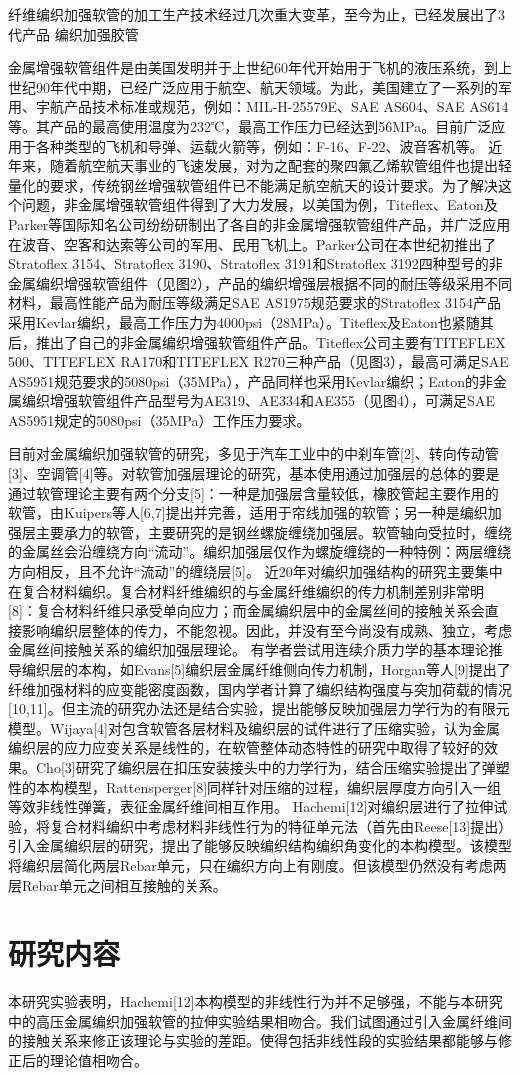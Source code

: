 纤维编织加强软管的加工生产技术经过几次重大变革，至今为止，已经发展出了3代产品
编织加强胶管

金属增强软管组件是由美国发明并于上世纪60年代开始用于飞机的液压系统，到上世纪90年代中期，已经广泛应用于航空、航天领域。为此，美国建立了一系列的军用、宇航产品技术标准或规范，例如：MIL-H-25579E、SAE AS604、SAE AS614等。其产品的最高使用温度为232℃，最高工作压力已经达到56MPa。目前广泛应用于各种类型的飞机和导弹、运载火箭等，例如：F-16、F-22、波音客机等。
近年来，随着航空航天事业的飞速发展，对为之配套的聚四氟乙烯软管组件也提出轻量化的要求，传统钢丝增强软管组件已不能满足航空航天的设计要求。为了解决这个问题，非金属增强软管组件得到了大力发展，以美国为例，Titeflex、Eaton及Parker等国际知名公司纷纷研制出了各自的非金属增强软管组件产品，并广泛应用在波音、空客和达索等公司的军用、民用飞机上。Parker公司在本世纪初推出了Stratoflex 3154、Stratoflex 3190、Stratoflex 3191和Stratoflex 3192四种型号的非金属编织增强软管组件（见图2），产品的编织增强层根据不同的耐压等级采用不同材料，最高性能产品为耐压等级满足SAE AS1975规范要求的Stratoflex 3154产品采用Kevlar编织，最高工作压力为4000psi（28MPa）。Titeflex及Eaton也紧随其后，推出了自己的非金属编织增强软管组件产品。Titeflex公司主要有TITEFLEX 500、TITEFLEX RA170和TITEFLEX R270三种产品（见图3），最高可满足SAE AS5951规范要求的5080psi（35MPa），产品同样也采用Kevlar编织；Eaton的非金属编织增强软管组件产品型号为AE319、AE334和AE355（见图4），可满足SAE AS5951规定的5080psi（35MPa）工作压力要求。



目前对金属编织加强软管的研究，多见于汽车工业中的中刹车管[2]、转向传动管[3]、空调管[4]等。对软管加强层理论的研究，基本使用通过加强层的总体的要是通过软管理论主要有两个分支[5]：一种是加强层含量较低，橡胶管起主要作用的软管，由Kuipers等人[6,7]提出并完善，适用于帘线加强的软管；另一种是编织加强层主要承力的软管，主要研究的是钢丝螺旋缠绕加强层。软管轴向受拉时，缠绕的金属丝会沿缠绕方向“流动”。编织加强层仅作为螺旋缠绕的一种特例：两层缠绕方向相反，且不允许“流动”的缠绕层[5]。
近20年对编织加强结构的研究主要集中在复合材料编织。复合材料纤维编织的与金属纤维编织的传力机制差别非常明[8]：复合材料纤维只承受单向应力；而金属编织层中的金属丝间的接触关系会直接影响编织层整体的传力，不能忽视。因此，并没有至今尚没有成熟、独立，考虑金属丝间接触关系的编织加强层理论。
有学者尝试用连续介质力学的基本理论推导编织层的本构，如Evans[5]编织层金属纤维侧向传力机制，Horgan等人[9]提出了纤维加强材料的应变能密度函数，国内学者计算了编织结构强度与突加荷载的情况[10,11]。但主流的研究办法还是结合实验，提出能够反映加强层力学行为的有限元模型。Wijaya[4]对包含软管各层材料及编织层的试件进行了压缩实验，认为金属编织层的应力应变关系是线性的，在软管整体动态特性的研究中取得了较好的效果。Cho[3]研究了编织层在扣压安装接头中的力学行为，结合压缩实验提出了弹塑性的本构模型，Rattensperger[8]同样针对压缩的过程，编织层厚度方向引入一组等效非线性弹簧，表征金属纤维间相互作用。
Hachemi[12]对编织层进行了拉伸试验，将复合材料编织中考虑材料非线性行为的特征单元法（首先由Reese[13]提出）引入金属编织层的研究，提出了能够反映编织结构编织角变化的本构模型。该模型将编织层简化两层Rebar单元，只在编织方向上有刚度。但该模型仍然没有考虑两层Rebar单元之间相互接触的关系。

\section{研究内容}
本研究实验表明，Hachemi[12]本构模型的非线性行为并不足够强，不能与本研究中的高压金属编织加强软管的拉伸实验结果相吻合。我们试图通过引入金属纤维间的接触关系来修正该理论与实验的差距。使得包括非线性段的实验结果都能够与修正后的理论值相吻合。
 
